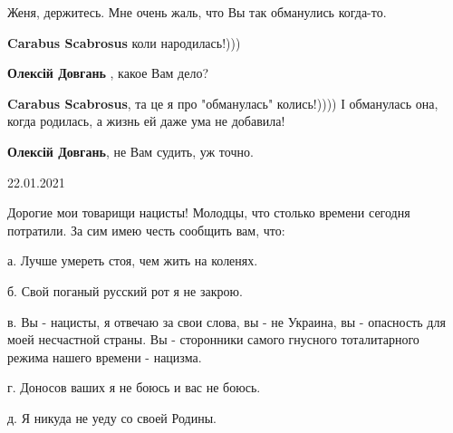 \begin{itemize}
 
Женя, держитесь. Мне очень жаль, что Вы так обманулись когда-то.

\begin{itemize}
 
\textbf{Carabus Scabrosus} коли народилась!)))

 
\textbf{Олексій Довгань} , какое Вам дело?

 
\textbf{Carabus Scabrosus}, та це я про "обманулась" колись!)))) І обманулась она, когда родилась, а жизнь ей даже ума не добавила!

 
\textbf{Олексій Довгань}, не Вам судить, уж точно.
\end{itemize}


22.01.2021

Дорогие мои товарищи нацисты! Молодцы, что столько времени сегодня потратили.
За сим имею честь сообщить вам, что: 

а. Лучше умереть стоя, чем жить на коленях. 

б. Свой поганый русский рот я не закрою. 

в. Вы - нацисты, я отвечаю за свои слова, вы - не Украина, вы - опасность для
моей несчастной страны. Вы - сторонники самого гнусного тоталитарного режима
нашего времени - нацизма. 

г. Доносов ваших я не боюсь и вас не боюсь. 

д. Я никуда не уеду со своей Родины.


\end{itemize}
